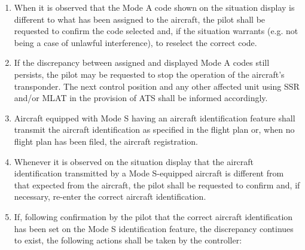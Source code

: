 
\begin{enumerate}
    \item When it is observed that the Mode A code shown on the situation display is different to what has been assigned to the aircraft, the pilot shall be requested to confirm the code selected and, if the situation warrants (e.g. not being a case of unlawful interference), to reselect the correct code.
    \item If the discrepancy between assigned and displayed Mode A codes still persists, the pilot may be requested to stop the operation of the aircraft's transponder. The next control position and any other affected unit using SSR and/or MLAT in the provision of ATS shall be informed accordingly.
    \item Aircraft equipped with Mode S having an aircraft identification feature shall transmit the aircraft identification as specified in the flight plan or, when no flight plan has been filed, the aircraft registration.
    \item Whenever it is observed on the situation display that the aircraft identification transmitted by a Mode S-equipped aircraft is different from that expected from the aircraft, the pilot shall be requested to confirm and, if necessary, re-enter the correct aircraft identification.
    \item If, following confirmation by the pilot that the correct aircraft identification has been set on the Mode S identification feature, the discrepancy continues to exist, the following actions shall be taken by the controller:

\end{enumerate}

